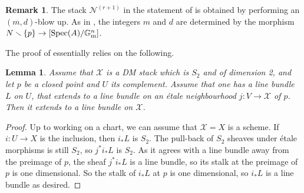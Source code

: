 \documentclass{amsart}
\newcommand{\bG}{\mathbb{G}}
\newcommand{\cN}{\mathcal{N}}
\newcommand{\cX}{\mathcal{X}}
\newcommand{\spec}{\operatorname{Spec}}
\newcommand{\Gm}{\bG_{{\rm m}}}
\newtheorem{Lemma}[theorem]{Lemma}
\theoremstyle{definition}
\newtheorem*{Oss'}{Remark}
\begin{document}
\begin{Oss'}
The stack $\cN^{(r+1)}$ in the statement of  is obtained by performing an $(m,d)$-blow up. As in , the integers $m$ and $d$ are determined by the morphism $N\smallsetminus\{p\} \to [\spec(A)/\Gm^n]$.
\end{Oss'}
The proof of  essentially relies on the following.

\begin{Lemma}\label{lemma estensere line bundles etale locally suffices}
Assume that $\cX$ is a DM stack which is $S_2$ and of dimension 2, and let $p$ be a closed point and $U$ its complement. Assume that one has a line bundle $L$ on $U$, that extends to a line bundle on an \'etale neighbourhood $j:V\to \cX$ of $p$. Then it extends to a line bundle on $\cX$.
\end{Lemma}
\begin{proof}
Up to working on a chart, we can assume that $\cX = X$ is a scheme. If $i:U\to X$ is the inclusion, then $i_*L$ is $S_2$.
The pull-back of $S_2$ sheaves under \'etale morphisms is still $S_2$, so $j^*i_*L$ is $S_2$. As it agrees with a line bundle away from the preimage of $p$, the sheaf $j^*i_*L$ is a line bundle, so its stalk at the preimage of $p$ is one dimensional. So the stalk of $i_*L$ at $p$ is one dimensional, so $i_*L$ is a line bundle as desired.
\end{proof}
\end{document}
